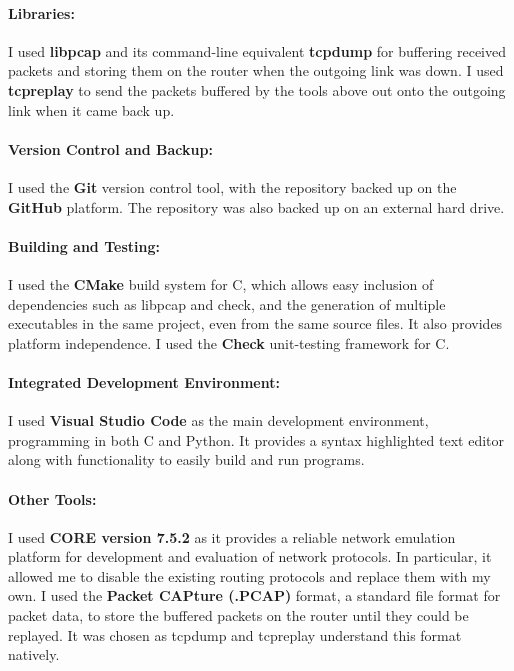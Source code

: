 \documentclass[withindex,glossary,openany]{cam-thesis}
\begin{document}
\paragraph{Libraries:}

I used \textbf{libpcap} and its command-line equivalent \textbf{tcpdump} \cite{TCPDUMP} for buffering received packets and storing them on the router when the outgoing link was down. I used \textbf{tcpreplay} \cite{TCPREPLAY} to send the packets buffered by the tools above out onto the outgoing link when it came back up.

\paragraph{Version Control and Backup:}

I used the \textbf{Git} version control tool, with the repository backed up on the \textbf{GitHub} platform. The repository was also backed up on an external hard drive.

\paragraph{Building and Testing:}

I used the \textbf{CMake} build system for C, which allows easy inclusion of dependencies such as libpcap and check, and the generation of multiple executables in the same project, even from the same source files. It also provides platform independence. I used the \textbf{Check} unit-testing framework for C.

\paragraph{Integrated Development Environment:}

I used \textbf{Visual Studio Code} as the main development environment, programming in both C and Python. It provides a syntax highlighted text editor along with functionality to easily build and run programs.

\paragraph{Other Tools:}

I used \textbf{CORE version 7.5.2} as it provides a reliable network emulation platform for development and evaluation of network protocols. In particular, it allowed me to disable the existing routing protocols and replace them with my own. I used the \textbf{Packet CAPture (.PCAP)} format, a standard file format for packet data, to store the buffered packets on the router until they could be replayed. It was chosen as tcpdump and tcpreplay understand this format natively.
\end{document}
